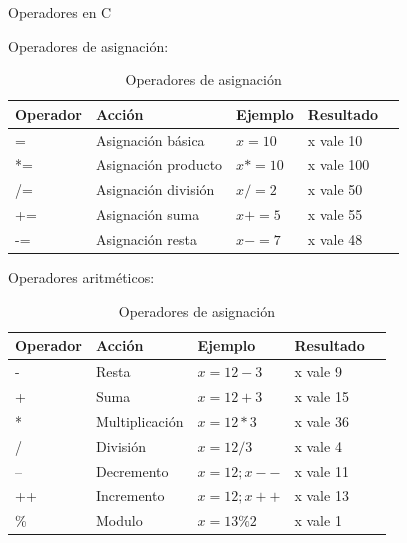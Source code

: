 \documentclass[xcolor=pdftex,table,11pt]{beamer}
\begin{document}
\begin{frame}[allowframebreaks] {Operadores en C}

Operadores de asignación:

\begin{table}
\begin{tabular}{p{15mm} | p{35mm} | p{22mm} | p{22mm} | p{22mm} }
Operador & Acción & Ejemplo & Resultado\\
\hline \hline 
= & 	Asignación básica  		  & $x=10$ 	 	& x vale 10\\
*= 	& 	Asignación producto       & $x*=10$ 	& x vale 100 \\
/= 	& 	Asignación división       & $x/=2$      & x vale 50 \\
+= 		& Asignación suma         & $x+=5$  	& x vale 55\\
-= 			& 	Asignación resta  & $x-=7$  	& x vale 48\\ 

\end{tabular}
\caption{Operadores de asignación}
\end{table}



\newpage
Operadores aritméticos:

\begin{table}
\begin{tabular}{p{15mm} | p{35mm} | p{22mm} | p{22mm} | p{22mm} }
Operador & Acción & Ejemplo & Resultado\\
\hline \hline  
- 	& 	Resta & $x=12 - 3 $ & x vale 9\\
+ 	& 	Suma & $x=12 + 3 $ & x vale 15\\
* 	& 	Multiplicación &  $x=12 * 3 $ & x vale 36\\
/ 	& 	División &  $x=12 / 3 $ & x vale 4\\
--	& 	Decremento &  $x=12; x-- $ & x vale 11\\
++	& 	Incremento &  $x=12; x++ $ & x vale 13\\
\%	& 	Modulo &  $x=13 \% 2 $ & x vale 1\\
\end{tabular}
\caption{Operadores de asignación}
\end{table}



\end{frame}
\end{document}
